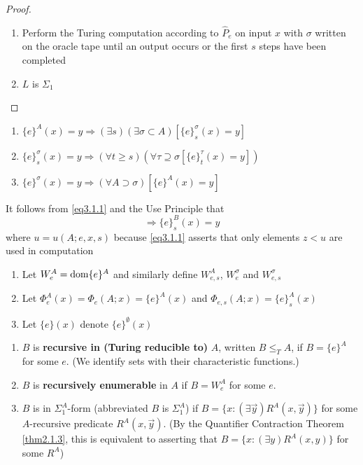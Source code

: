 \documentclass[11pt]{article}
\begin{document}
\begin{proof}
\begin{enumerate}
\item Perform the Turing computation according to \(\widehat{P}_e\) on input
\(x\) with \(\sigma\) written on the oracle tape until an output occurs or the
first \(s\) steps have been completed
\item \(L\) is \(\Sigma_1\)
\end{enumerate}
\end{proof}

\begin{theorem}
\label{thm3.1.9}
\begin{enumerate}
\item \(\{e\}^A(x)=y\Longrightarrow(\exists s)(\exists \sigma\subset A)
      [\{e\}_s^\sigma(x)=y]\)
\item \(\{e\}_s^\sigma(x)=y\Longrightarrow(\forall t\ge
      s)(\forall\tau\supseteq\sigma
      [\{e\}_t^\tau(x)=y])\)
\item \(\{e\}^\sigma(x)=y\Longrightarrow(\forall A\supset\sigma)[\{e\}^A(x)=y]\)
\end{enumerate}
\end{theorem}

It follows from \eqref{eq3.1.1} and the Use Principle that
\begin{equation}
[\{e\}_s^A(x)=y\;\&\;A\restriction u=B\restriction u]
\Longrightarrow\{e\}_s^B(x)=y\label{eq3.1.3}
\end{equation}
where \(u=u(A;e,x,s)\) because \eqref{eq3.1.1} asserts that only elements
\(z<u\) are used in computation

\begin{definition}[]
\begin{enumerate}
\item Let \(W_e^A=\operatorname{dom}\{e\}^A\) and similarly define \(W_{e,s}^A\),
\(W_e^\sigma\) and \(W_{e,s}^\sigma\)
\item Let \(\Phi_e^A(x)=\Phi_e(A;x)=\{e\}^A(x)\) and
\(\Phi_{e,s}(A;x)=\{e\}_s^A(x)\)
\item Let \(\{e\}(x)\) denote \(\{e\}^\emptyset(x)\)
\end{enumerate}
\end{definition}

\begin{definition}[]
\begin{enumerate}
\item \(B\) is \textbf{recursive in (Turing reducible to)} \(A\), written \(B\le_T A\),
if \(B=\{e\}^A\) for some \(e\).  (We identify sets with their
characteristic functions.)
\item \(B\) is \textbf{recursively enumerable} in \(A\) if \(B=W_e^A\) for some \(e\).
\item \(B\) is in \(\Sigma_1^A\)-form (abbreviated \(B\) is \(\Sigma_1^A\)) if
\(B=\{x: (\exists\vec{y})R^A(x,\vec{y})\}\) for some \(A\)-recursive
predicate \(R^A(x,\vec{y})\). (By the Quantifier Contraction Theorem
\ref{thm2.1.3}, this is equivalent to asserting that \(B=\{x:(\exists
      y)R^A(x,y)\}\) for some \(R^A\))
\end{enumerate}
\end{definition}
\end{document}
